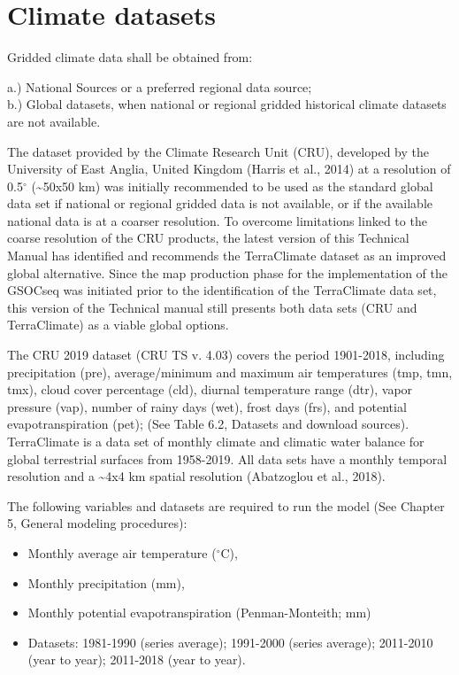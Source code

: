 \documentclass[
  10pt,
  b5paper,
]{book}
\providecommand{\tightlist}{%
  \setlength{\itemsep}{0pt}\setlength{\parskip}{0pt}}
\begin{document}
\hypertarget{climate-datasets}{%
\section{Climate datasets}\label{climate-datasets}}

Gridded climate data shall be obtained from:

a.) National Sources or a preferred regional data source;\\
b.) Global datasets, when national or regional gridded historical climate datasets are not available.

The dataset provided by the Climate Research Unit (CRU), developed by the University of East Anglia, United Kingdom (Harris et al., 2014) at a resolution of 0.5\(^\circ\) (\textasciitilde50x50 km) was initially recommended to be used as the standard global data set if national or regional gridded data is not available, or if the available national data is at a coarser resolution.
To overcome limitations linked to the coarse resolution of the CRU products, the latest version of this Technical Manual has identified and recommends the TerraClimate dataset as an improved global alternative.
Since the map production phase for the implementation of the GSOCseq was initiated prior to the identification of the TerraClimate data set, this version of the Technical manual still presents both data sets (CRU and TerraClimate) as a viable global options.

The CRU 2019 dataset (CRU TS v. 4.03) covers the period 1901-2018, including precipitation (pre), average/minimum and maximum air temperatures (tmp, tmn, tmx), cloud cover percentage (cld), diurnal temperature range (dtr), vapor pressure (vap), number of rainy days (wet), frost days (frs), and potential evapotranspiration (pet); (See Table 6.2, Datasets and download sources).\\
TerraClimate is a data set of monthly climate and climatic water balance for global terrestrial surfaces from 1958-2019. All data sets have a monthly temporal resolution and a \textasciitilde4x4 km spatial resolution (Abatzoglou et al., 2018).

The following variables and datasets are required to run the model (See Chapter 5, General modeling procedures):

\begin{itemize}
\tightlist
\item
  Monthly average air temperature (\(^\circ\)C),
\item
  Monthly precipitation (mm),
\item
  Monthly potential evapotranspiration (Penman-Monteith; mm)
\item
  Datasets: 1981-1990 (series average); 1991-2000 (series average); 2011-2010 (year to year); 2011-2018 (year to year).
\end{itemize}
\end{document}
